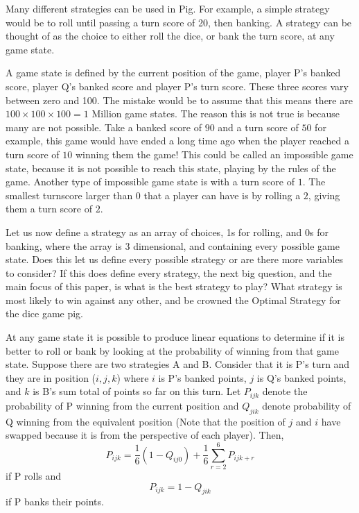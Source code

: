 \documentclass[a4paper,titlepage]{article}
\begin{document}
Many different strategies can be used in Pig. For example, a simple strategy would be to roll until passing a turn score of 20, then banking. A strategy can be thought of as the choice to either roll the dice, or bank the turn score, at any game state.

A game state is defined by the current position of the game, player P's banked score, player Q's banked score and player P's turn score. These three scores vary between zero and 100. The mistake would be to assume that this means there are $100\times100\times100 = 1$ Million game states. The reason this is not true is because many are not possible. Take a banked score of $90$ and a turn score of $50$ for example, this game would have ended a long time ago when the player reached a turn score of $10$ winning them the game! This could be called an impossible game state, because it is not possible to reach this state, playing by the rules of the game. Another type of impossible game state is with a turn score of $1$. The smallest turnscore larger than $0$ that a player can have is by rolling a $2$, giving them a turn score of $2$.

Let us now define a strategy as an array of choices, 1s for rolling, and 0s for banking, where the array is 3 dimensional, and containing every possible game state. Does this let us define every possible strategy or are there more variables to consider? If this does define every strategy, the next big question, and the main focus of this paper, is what is the best strategy to play? What strategy is most likely to win against any other, and be crowned the Optimal Strategy for the dice game pig.

At any game state it is possible to produce linear equations to determine if it is better to roll or bank by looking at the probability of winning from that game state. Suppose there are two strategies A and B. Consider that it is P's turn and they are in position ($i,j,k$) where $i$ is P's banked points, $j$ is Q's banked points, and $k$ is B's sum total of points so far on this turn. Let $P_{ijk}$ denote the probability of P winning from the current position and $Q_{jik}$ denote probability of Q winning from the equivalent position (Note that the position of $j$ and $i$ have swapped because it is from the perspective of each player). Then,
\begin{equation}\label{1.2.1.a}
P_{ijk} = \dfrac{1}{6} (1-Q_{ij0}) + \dfrac{1}{6}\sum^{6}_{r=2}P_{ijk+r}
\end{equation}
if P rolls and
\begin{equation}\label{1.2.1.b}
P_{ijk} = 1-Q_{jik}
\end{equation}
if P banks their points.
\end{document}
